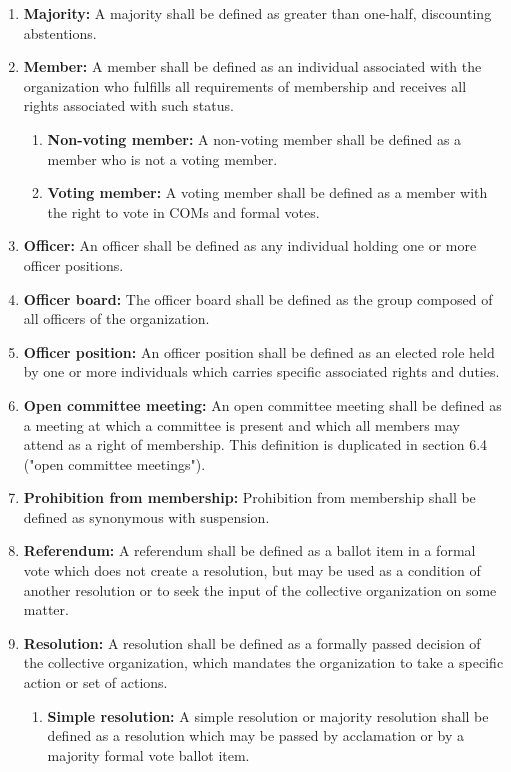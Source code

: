 \documentclass[11pt]{article}
\newcounter{h1}
\newcounter{h2}[h1]
\newcounter{h3}[h2]
\begin{document}
\begin{enumerate}
  \item \textbf{Majority:} A majority shall be defined as greater than one-half, discounting abstentions.
  \item \textbf{Member:} A member shall be defined as an individual associated with the organization who fulfills all requirements of membership and receives all rights associated with such status.
        \begin{enumerate}
          \item \textbf{Non-voting member:} A non-voting member shall be defined as a member who is not a voting member.
          \item \textbf{Voting member:} A voting member shall be defined as a member with the right to vote in COMs and formal votes.
        \end{enumerate}
  \item \textbf{Officer:} An officer shall be defined as any individual holding one or more officer positions.
  \item \textbf{Officer board:} The officer board shall be defined as the group composed of all officers of the organization.
  \item \textbf{Officer position:} An officer position shall be defined as an elected role held by one or more individuals which carries specific associated rights and duties.
  \item \textbf{Open committee meeting:} An open committee meeting shall be defined as a meeting at which a committee is present and which all members may attend as a right of membership. This definition is duplicated in section 6.4 ("open committee meetings"). 
  \item \textbf{Prohibition from membership:} Prohibition from membership shall be defined as synonymous with suspension.
  \item \textbf{Referendum:} A referendum shall be defined as a ballot item in a formal vote which does not create a resolution, but may be used as a condition of another resolution or to seek the input of the collective organization on some matter.
  \item \textbf{Resolution:} A resolution shall be defined as a formally passed decision of the collective organization, which mandates the organization to take a specific action or set of actions.
        \begin{enumerate}
          \item \textbf{Simple resolution:} A simple resolution or majority resolution shall be defined as a resolution which may be passed by acclamation or by a majority formal vote ballot item.

\end{enumerate}
\end{enumerate}
\end{document}
